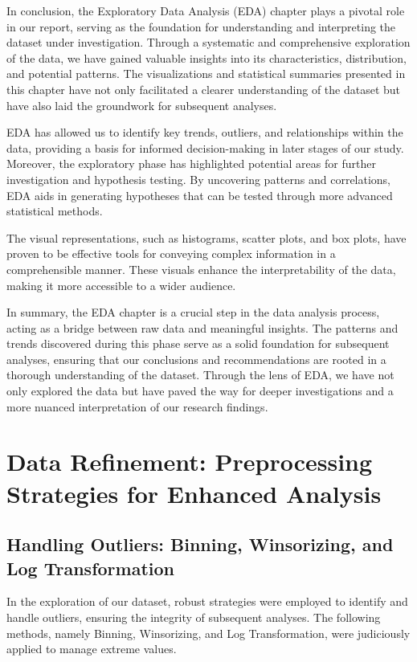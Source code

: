 \documentclass{article}
\begin{document}
            In conclusion, the Exploratory Data Analysis (EDA) chapter plays a pivotal role in our report, serving as the foundation for understanding and interpreting the dataset under investigation. Through a systematic and comprehensive exploration of the data, we have gained valuable insights into its characteristics, distribution, and potential patterns. The visualizations and statistical summaries presented in this chapter have not only facilitated a clearer understanding of the dataset but have also laid the groundwork for subsequent analyses.

            EDA has allowed us to identify key trends, outliers, and relationships within the data, providing a basis for informed decision-making in later stages of our study. Moreover, the exploratory phase has highlighted potential areas for further investigation and hypothesis testing. By uncovering patterns and correlations, EDA aids in generating hypotheses that can be tested through more advanced statistical methods.
            
            The visual representations, such as histograms, scatter plots, and box plots, have proven to be effective tools for conveying complex information in a comprehensible manner. These visuals enhance the interpretability of the data, making it more accessible to a wider audience.
            
            In summary, the EDA chapter is a crucial step in the data analysis process, acting as a bridge between raw data and meaningful insights. The patterns and trends discovered during this phase serve as a solid foundation for subsequent analyses, ensuring that our conclusions and recommendations are rooted in a thorough understanding of the dataset. Through the lens of EDA, we have not only explored the data but have paved the way for deeper investigations and a more nuanced interpretation of our research findings.


            
\section{Data Refinement: Preprocessing Strategies for Enhanced Analysis}

\subsection{Handling Outliers: Binning, Winsorizing, and Log Transformation}
In the exploration of our dataset, robust strategies were employed to identify and handle outliers, ensuring the integrity of subsequent analyses. The following methods, namely Binning, Winsorizing, and Log Transformation, were judiciously applied to manage extreme values.
\end{document}
